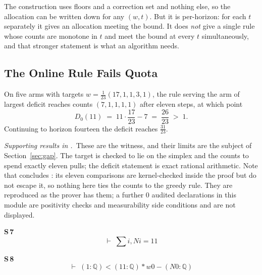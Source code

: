 
The construction uses floors and a correction set and nothing else, so the allocation can be
written down for any $(w,t)$. But it is per-horizon: for each $t$ separately it gives an
allocation meeting the bound. It does \emph{not} give a single rule whose counts are monotone
in $t$ and meet the bound at every $t$ simultaneously, and that stronger statement is what an
algorithm needs.

\subsection{The Online Rule Fails Quota}
\label{sec:fails}

\begin{theorem}
\label{thm:quotafails}
On five arms with targets $w=\frac{1}{23}(17,1,1,3,1)$, the rule serving the arm of largest
deficit reaches counts $(7,1,1,1,1)$ after eleven steps, at which point
\begin{equation}
D_{0}(11)\;=\;11\cdot\frac{17}{23}-7\;=\;\frac{26}{23}\;>\;1 .
\label{eq:quotafail}
\end{equation}
Continuing to horizon fourteen the deficit reaches $\frac{31}{23}$.
\end{theorem}


\noindent\emph{Supporting results in .}~These are the witness, and their limits are the subject of Section~\ref{sec:gap}. The target is checked to lie on the simplex and the counts to spend exactly eleven pulls; the deficit statement is exact rational arithmetic. Note that  concludes : its eleven comparisons are kernel-checked inside the proof but do not escape it, so nothing here ties the counts to the greedy rule. They are reproduced as the prover has them; a further $0$ audited declarations in this module are positivity checks and measurability side conditions and are not displayed.

\noindent\textbf{S\,7}\quad{}
{\footnotesize\[ \vdash\; \textstyle\sum \mathit{i}, \mathit{N} \mathit{i} = 11 \]}

\noindent\textbf{S\,8}\quad{}
{\footnotesize\[ \vdash\; (1 : \mathbb{Q} ) < (11 : \mathbb{Q} ) * \mathit{w} 0 - (\mathit{N} 0 : \mathbb{Q} ) \]}


